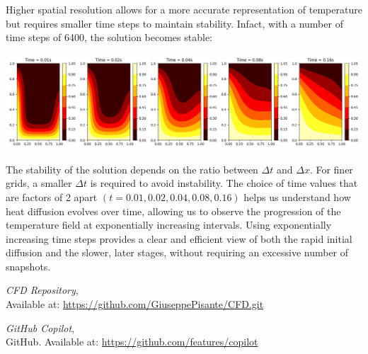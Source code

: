 \documentclass{article}
\begin{document}
Higher spatial resolution allows for a more accurate representation of temperature but requires smaller
time steps to maintain stability. Infact, with a number of time steps of 6400, the solution becomes stable:

\includegraphics[width=\textwidth]{Figure_4.png}\par\vspace{1cm}

The stability of the solution depends on the ratio between \( \Delta t \) and \( \Delta x \). For finer grids, a smaller \( \Delta t \) 
is required to avoid instability. The choice of time values that are factors of 2 apart \( (t = 0.01, 0.02, 0.04, 0.08, 0.16) \) helps us
understand how heat diffusion evolves over time, allowing us to observe the progression of the temperature field at exponentially increasing 
intervals. Using exponentially increasing time steps provides a clear and efficient view of both the rapid initial diffusion and the slower, 
later stages, without requiring an excessive number of snapshots.


\begin{thebibliography}{9}
    \textit{CFD Repository},\\
    Available at: \url{https://github.com/GiuseppePisante/CFD.git}
    
    \textit{GitHub Copilot},\\
    GitHub. Available at: \url{https://github.com/features/copilot}
    \end{thebibliography}
\end{document}
